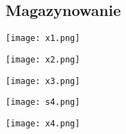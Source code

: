 \subsection*{Magazynowanie}

\begin{center}
    \texttt{[image: x1.png]}\\[0.5cm]
\end{center}
\begin{center}
    \texttt{[image: x2.png]}\\[0.5cm]
\end{center}
\begin{center}
    \texttt{[image: x3.png]}\\[0.5cm]
\end{center}
\begin{center}
    \texttt{[image: s4.png]}\\[0.5cm]
\end{center}
\begin{center}
    \texttt{[image: x4.png]}\\[0.5cm]
\end{center}